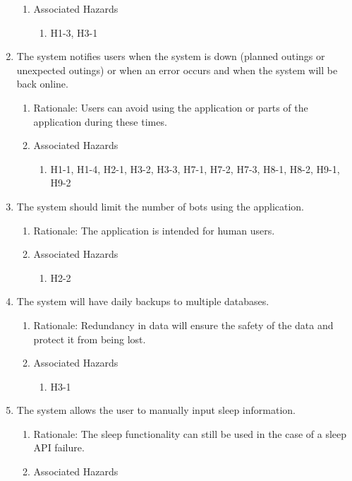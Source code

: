 \documentclass{article}
\begin{document}
\begin{enumerate}
\begin{enumerate}
		\item Associated Hazards
		\begin{enumerate}
			\item H1-3, H3-1
		\end{enumerate}
	\end{enumerate} 
	\item The system notifies users when the system is down (planned outings or unexpected outings) or when an error occurs and when the system will be back online. 
	\begin{enumerate}
		\item Rationale: Users can avoid using the application or parts of the application during these times. 
		\item Associated Hazards
		\begin{enumerate}
			\item H1-1, H1-4, H2-1, H3-2, H3-3, H7-1, H7-2, H7-3, H8-1, H8-2, H9-1, H9-2
		\end{enumerate}
	\end{enumerate}
	\item The system should limit the number of bots using the application.
	\begin{enumerate}
		\item Rationale: The application is intended for human users.
		\item Associated Hazards
		\begin{enumerate}
			\item H2-2
		\end{enumerate}
	\end{enumerate}
	\item The system will have daily backups to multiple databases.
	\begin{enumerate}
		\item Rationale: Redundancy in data will ensure the safety of the data and protect it from being lost.
		\item Associated Hazards
		\begin{enumerate}
			\item H3-1
		\end{enumerate}
	\end{enumerate}
	\item The system allows the user to manually input sleep information.
	\begin{enumerate}
		\item Rationale: The sleep functionality can still be used in the case of a sleep API failure.
		\item Associated Hazards

\end{enumerate}
\end{enumerate}
\end{document}
